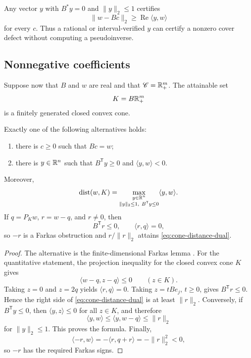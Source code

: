 \begin{corollary}
\label{cor:dual-lower-bound}
Any vector \(y\) with \(B^*y=0\) and \(\|y\|_2\le1\) certifies
\[
 \|w-Bc\|_2
 \ge
 \operatorname{Re}\langle y,w\rangle
\]
for every \(c\).  Thus a rational or interval-verified \(y\) can
certify a nonzero cover defect without computing a pseudoinverse.
\end{corollary}

\subsection{Nonnegative coefficients}

Suppose now that \(B\) and \(w\) are real and that
\(\mathscr C=\mathbb R_+^m\).  The attainable set
\[
 K=B\mathbb R_+^m
\]
is a finitely generated closed convex cone.

\begin{theorem}
\label{thm:farkas-cone}
Exactly one of the following alternatives holds:
\begin{enumerate}[label=(\alph*),leftmargin=2.2em]
\item there is \(c\ge0\) such that \(Bc=w\);
\item there is \(y\in\mathbb R^n\) such that
  \(B^{\mathsf T}y\ge0\) and \(\langle y,w\rangle<0\).
\end{enumerate}
Moreover,
\begin{equation}
 \operatorname{dist}(w,K)
 =
 \max_{\substack{y\in\mathbb R^n\\
                  \|y\|_2\le1,\ B^{\mathsf T}y\le0}}
 \langle y,w\rangle.
 \label{eq:cone-distance-dual}
\end{equation}
If \(q=P_Kw\), \(r=w-q\), and \(r\ne0\), then
\[
 B^{\mathsf T}r\le0,\qquad
 \langle r,q\rangle=0,
\]
so \(-r\) is a Farkas obstruction and \(r/\|r\|_2\) attains
\eqref{eq:cone-distance-dual}.
\end{theorem}

\begin{proof}
The alternative is the finite-dimensional Farkas lemma
\citep{Schrijver1986}.  For the quantitative statement, the
projection inequality for the closed convex cone \(K\) gives
\[
 \langle w-q,z-q\rangle\le0
 \qquad(z\in K).
\]
Taking \(z=0\) and \(z=2q\) yields
\(\langle r,q\rangle=0\).  Taking \(z=tBe_j\), \(t\ge0\), gives
\(B^{\mathsf T}r\le0\).  Hence the right side of
\eqref{eq:cone-distance-dual} is at least \(\|r\|_2\).
Conversely, if \(B^{\mathsf T}y\le0\), then
\(\langle y,z\rangle\le0\) for all \(z\in K\), and therefore
\[
 \langle y,w\rangle
 \le
 \langle y,w-q\rangle
 \le
 \|r\|_2
\]
for \(\|y\|_2\le1\).  This proves the formula.  Finally,
\[
 \langle-r,w\rangle
 =
 -\langle r,q+r\rangle
 =
 -\|r\|_2^2<0,
\]
so \(-r\) has the required Farkas signs.
\end{proof}

